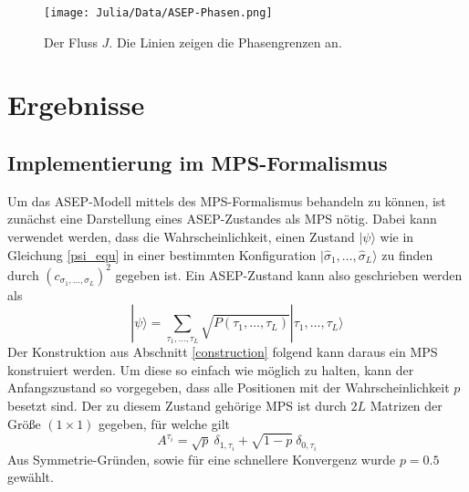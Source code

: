 \documentclass[10pt,a4paper]{report}
\newcommand{\SumIndex}{\sigma_1,\ldots,\sigma_L}
\newcommand{\SumIndexTau}{\tau_1,\ldots,\tau_L}
\begin{document}
\begin{figure}
\begin{center}
\texttt{[image: Julia/Data/ASEP-Phasen.png]}
\caption{Der Fluss $J$. Die Linien zeigen die Phasengrenzen an.}
\label{ASEP_flux_analy}
\end{center}
\end{figure}

 

\chapter{Ergebnisse}
\section{Implementierung im MPS-Formalismus}

Um das ASEP-Modell mittels des MPS-Formalismus behandeln zu können, ist zunächst eine Darstellung eines ASEP-Zustandes als MPS nötig. Dabei kann verwendet werden, dass die Wahrscheinlichkeit, einen Zustand $|\psi\rangle$ wie in Gleichung \ref{psi_equ} in einer bestimmten Konfiguration $|\hat{\sigma}_1,\ldots,\hat{\sigma}_L\rangle$ zu finden durch $(c_{\SumIndex})^2$ gegeben ist. Ein ASEP-Zustand kann also geschrieben werden als
\begin{equation}
|\psi\rangle=\sum_{\SumIndexTau} \sqrt{P(\SumIndexTau)}|\SumIndexTau\rangle
\end{equation}
Der Konstruktion aus Abschnitt \ref{construction} folgend kann daraus ein MPS konstruiert werden. Um diese so einfach wie möglich zu halten, kann der Anfangszustand so vorgegeben, dass alle Positionen mit der Wahrscheinlichkeit $p$ besetzt sind. Der zu diesem Zustand gehörige MPS ist durch $2L$ Matrizen der Größe $(1\times 1)$ gegeben, für welche gilt 
\begin{equation}\label{mean_field_MPS}
A^{\tau_i}=\sqrt{p}\ \delta_{1,\tau_i}+\sqrt{1-p}\ \delta_{0,\tau_i}
\end{equation}
Aus Symmetrie-Gründen, sowie für eine schnellere Konvergenz wurde $p=0.5$ gewählt.
\end{document}
